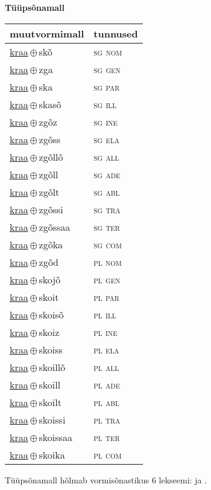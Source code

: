 

\vspace{3.5em}
\noindent \begin{minipage}{\textwidth}
\noindent \textbf{Tüüpsõnamall \,}\\

\begin{sideways}
\begin{tabular}{l l}
muutvormimall & tunnused \\
\hline
\underline{kraa}\,$\oplus$\,skõ & \textsc{ sg nom } \\
\underline{kraa}\,$\oplus$\,zga & \textsc{ sg gen } \\
\underline{kraa}\,$\oplus$\,ska & \textsc{ sg par } \\
\underline{kraa}\,$\oplus$\,skasõ & \textsc{ sg ill } \\
\underline{kraa}\,$\oplus$\,zgõz & \textsc{ sg ine } \\
\underline{kraa}\,$\oplus$\,zgõss & \textsc{ sg ela } \\
\underline{kraa}\,$\oplus$\,zgõllõ & \textsc{ sg all } \\
\underline{kraa}\,$\oplus$\,zgõll & \textsc{ sg ade } \\
\underline{kraa}\,$\oplus$\,zgõlt & \textsc{ sg abl } \\
\underline{kraa}\,$\oplus$\,zgõssi & \textsc{ sg tra } \\
\underline{kraa}\,$\oplus$\,zgõssaa & \textsc{ sg ter } \\
\underline{kraa}\,$\oplus$\,zgõka & \textsc{ sg com } \\
\underline{kraa}\,$\oplus$\,zgõd & \textsc{ pl nom } \\
\underline{kraa}\,$\oplus$\,skojõ & \textsc{ pl gen } \\
\underline{kraa}\,$\oplus$\,skoit & \textsc{ pl par } \\
\underline{kraa}\,$\oplus$\,skoisõ & \textsc{ pl ill } \\
\underline{kraa}\,$\oplus$\,skoiz & \textsc{ pl ine } \\
\underline{kraa}\,$\oplus$\,skoiss & \textsc{ pl ela } \\
\underline{kraa}\,$\oplus$\,skoillõ & \textsc{ pl all } \\
\underline{kraa}\,$\oplus$\,skoill & \textsc{ pl ade } \\
\underline{kraa}\,$\oplus$\,skoilt & \textsc{ pl abl } \\
\underline{kraa}\,$\oplus$\,skoissi & \textsc{ pl tra } \\
\underline{kraa}\,$\oplus$\,skoissaa & \textsc{ pl ter } \\
\underline{kraa}\,$\oplus$\,skoika & \textsc{ pl com } \\
\end{tabular}
\end{sideways}
\label{tab:tüüpsõnamall-kraaskõ}

\end{minipage}

 
\vspace{1em}
\noindent Tüüpsõnamall  hõlmab vormisõnastikus 6 lekseemi:  ja .
